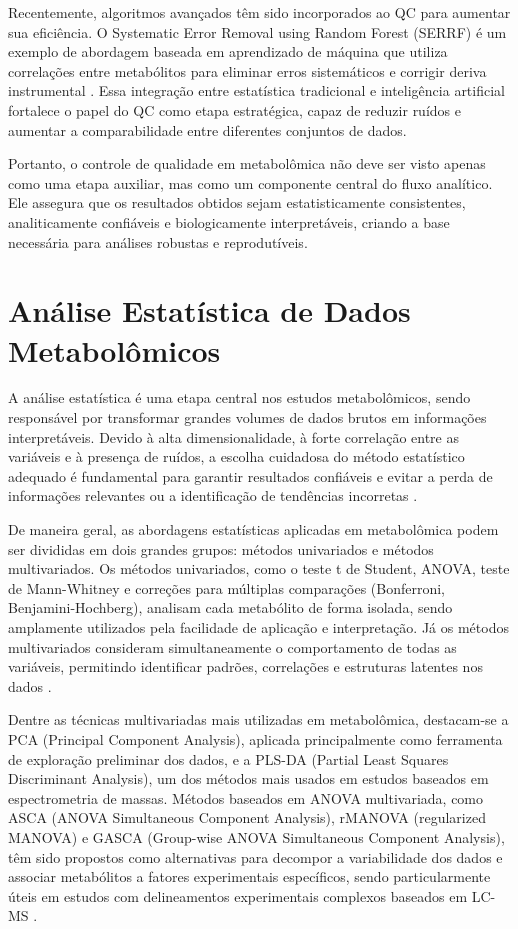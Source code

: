 Recentemente, algoritmos avançados têm sido incorporados ao QC para aumentar sua eficiência. O Systematic Error Removal using Random Forest (SERRF) é um exemplo de abordagem baseada em aprendizado de máquina que utiliza correlações entre metabólitos para eliminar erros sistemáticos e corrigir deriva instrumental \cite{fan2019systematic}. Essa integração entre estatística tradicional e inteligência artificial fortalece o papel do QC como etapa estratégica, capaz de reduzir ruídos e aumentar a comparabilidade entre diferentes conjuntos de dados.

Portanto, o controle de qualidade em metabolômica não deve ser visto apenas como uma etapa auxiliar, mas como um componente central do fluxo analítico. Ele assegura que os resultados obtidos sejam estatisticamente consistentes, analiticamente confiáveis e biologicamente interpretáveis, criando a base necessária para análises robustas e reprodutíveis.


\section{\textbf{Análise Estatística de Dados Metabolômicos}}

A análise estatística é uma etapa central nos estudos metabolômicos, sendo responsável por transformar grandes volumes de dados brutos em informações interpretáveis. Devido à alta dimensionalidade, à forte correlação entre as variáveis e à presença de ruídos, a escolha cuidadosa do método estatístico adequado é fundamental para garantir resultados confiáveis e evitar a perda de informações relevantes ou a identificação de tendências incorretas \cite{anwardeen2023statistical}.

De maneira geral, as abordagens estatísticas aplicadas em metabolômica podem ser divididas em dois grandes grupos: métodos univariados e métodos multivariados. Os métodos univariados, como o teste t de Student, ANOVA, teste de Mann-Whitney e correções para múltiplas comparações (Bonferroni, Benjamini-Hochberg), analisam cada metabólito de forma isolada, sendo amplamente utilizados pela facilidade de aplicação e interpretação. Já os métodos multivariados consideram simultaneamente o comportamento de todas as variáveis, permitindo identificar padrões, correlações e estruturas latentes nos dados \cite{anwardeen2023statistical,antonelli2019statistical}.

Dentre as técnicas multivariadas mais utilizadas em metabolômica, destacam-se a PCA (Principal Component Analysis), aplicada principalmente como ferramenta de exploração preliminar dos dados, e a PLS-DA (Partial Least Squares Discriminant Analysis), um dos métodos mais usados em estudos baseados em espectrometria de massas. Métodos baseados em ANOVA multivariada, como ASCA (ANOVA Simultaneous Component Analysis), rMANOVA (regularized MANOVA) e GASCA (Group-wise ANOVA Simultaneous Component Analysis), têm sido propostos como alternativas para decompor a variabilidade dos dados e associar metabólitos a fatores experimentais específicos, sendo particularmente úteis em estudos com delineamentos experimentais complexos baseados em LC-MS \cite{perezcova2022comparison}.


